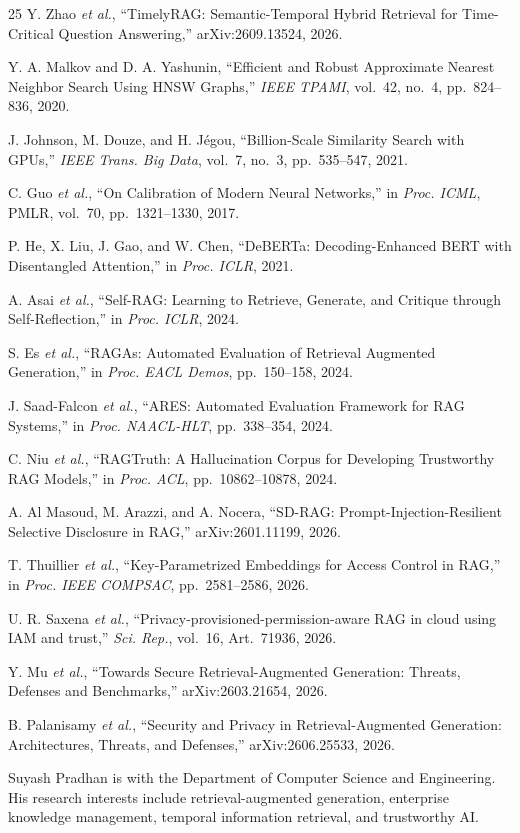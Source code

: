 \documentclass[journal]{IEEEtran}
\begin{document}
\begin{thebibliography}{25}
Y. Zhao \emph{et al.}, ``TimelyRAG: Semantic-Temporal Hybrid Retrieval for Time-Critical Question Answering,'' arXiv:2609.13524, 2026.

Y. A. Malkov and D. A. Yashunin, ``Efficient and Robust Approximate Nearest Neighbor Search Using HNSW Graphs,'' \emph{IEEE TPAMI}, vol.~42, no.~4, pp.~824--836, 2020.

J. Johnson, M. Douze, and H. J\'{e}gou, ``Billion-Scale Similarity Search with GPUs,'' \emph{IEEE Trans. Big Data}, vol.~7, no.~3, pp.~535--547, 2021.

C. Guo \emph{et al.}, ``On Calibration of Modern Neural Networks,'' in \emph{Proc. ICML}, PMLR, vol.~70, pp.~1321--1330, 2017.

P. He, X. Liu, J. Gao, and W. Chen, ``DeBERTa: Decoding-Enhanced BERT with Disentangled Attention,'' in \emph{Proc. ICLR}, 2021.

A. Asai \emph{et al.}, ``Self-RAG: Learning to Retrieve, Generate, and Critique through Self-Reflection,'' in \emph{Proc. ICLR}, 2024.

S. Es \emph{et al.}, ``RAGAs: Automated Evaluation of Retrieval Augmented Generation,'' in \emph{Proc. EACL Demos}, pp.~150--158, 2024.

J. Saad-Falcon \emph{et al.}, ``ARES: Automated Evaluation Framework for RAG Systems,'' in \emph{Proc. NAACL-HLT}, pp.~338--354, 2024.

C. Niu \emph{et al.}, ``RAGTruth: A Hallucination Corpus for Developing Trustworthy RAG Models,'' in \emph{Proc. ACL}, pp.~10862--10878, 2024.

A. Al Masoud, M. Arazzi, and A. Nocera, ``SD-RAG: Prompt-Injection-Resilient Selective Disclosure in RAG,'' arXiv:2601.11199, 2026.

T. Thuillier \emph{et al.}, ``Key-Parametrized Embeddings for Access Control in RAG,'' in \emph{Proc. IEEE COMPSAC}, pp.~2581--2586, 2026.

U. R. Saxena \emph{et al.}, ``Privacy-provisioned-permission-aware RAG in cloud using IAM and trust,'' \emph{Sci. Rep.}, vol.~16, Art.~71936, 2026.

Y. Mu \emph{et al.}, ``Towards Secure Retrieval-Augmented Generation: Threats, Defenses and Benchmarks,'' arXiv:2603.21654, 2026.

B. Palanisamy \emph{et al.}, ``Security and Privacy in Retrieval-Augmented Generation: Architectures, Threats, and Defenses,'' arXiv:2606.25533, 2026.

\end{thebibliography}

\begin{IEEEbiographynophoto}{Suyash Pradhan}
is with the Department of Computer Science and Engineering. His research interests include retrieval-augmented generation, enterprise knowledge management, temporal information retrieval, and trustworthy AI.
\end{IEEEbiographynophoto}
\end{document}

